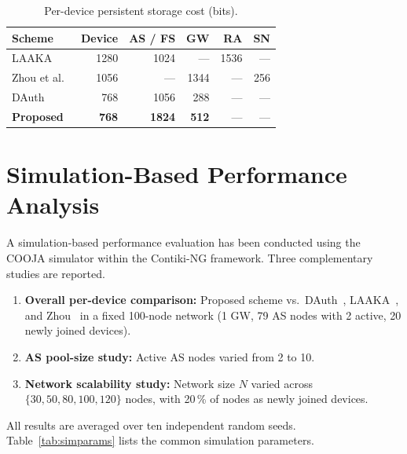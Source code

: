 \begin{table}[!ht]
  \centering
  \caption{Per-device persistent storage cost (bits).}
  \label{tab:storage}
  \small
  \setlength{\tabcolsep}{6pt}
  \begin{tabular}{@{}lrrrrr@{}}
    \toprule
    Scheme & Device & AS / FS & GW & RA & SN \\
    \midrule
    LAAKA~\cite{ali2024laaka}       & 1280 & 1024 & ---  & 1536 & ---  \\
    Zhou et al.~\cite{zhou2024auth}  & 1056 & ---  & 1344 & --- & 256  \\
    DAuth~\cite{das2026comsnets}     & 768  & 1056 & 288  & --- & ---  \\
    \textbf{Proposed}               & \textbf{768} & \textbf{1824} & \textbf{512} & --- & --- \\
    \bottomrule
  \end{tabular}
\end{table}

\FloatBarrier
\section{Simulation-Based Performance Analysis}
\label{sec:sim}

A simulation-based performance evaluation has been conducted using the COOJA
simulator within the Contiki-NG framework.
Three complementary studies are reported.
\begin{enumerate}
  \item \textbf{Overall per-device comparison:} Proposed scheme vs.\
    DAuth~\cite{das2026comsnets}, LAAKA~\cite{ali2024laaka}, and Zhou~\cite{zhou2024auth}
    in a fixed 100-node network (1 GW, 79 AS nodes with 2 active, 20 newly joined devices).
  \item \textbf{AS pool-size study:} Active AS nodes varied from 2 to 10.
  \item \textbf{Network scalability study:} Network size $N$ varied across
    $\{30, 50, 80, 100, 120\}$ nodes, with 20\,\% of nodes as newly joined devices.
\end{enumerate}
All results are averaged over ten independent random seeds.
Table~\ref{tab:simparams} lists the common simulation parameters.

